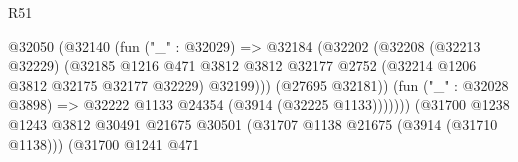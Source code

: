 \begin{lexlean}{R51}
\begin{coremodule}
                                                      @32050
                                                        (@32140
                                                          (fun ("_" : @32029) =>
                                                          @32184
                                                            (@32202
                                                              (@32208
                                                                (@32213 @32229)
                                                                (@32185
                                                                  @1216
                                                                  @471
                                                                  @3812
                                                                  @3812
                                                                  @32177
                                                                  @2752
                                                                  (@32214
                                                                    @1206
                                                                    @3812
                                                                    @32175
                                                                    @32177
                                                                    @32229)
                                                                  @32199)))
                                                            (@27695 @32181))
                                                          (fun ("_" : @32028 @3898) =>
                                                          @32222
                                                            @1133
                                                            @24354
                                                            (@3914 (@32225 @1133)))))))
                                                  (@31700
                                                    @1238
                                                    @1243
                                                    @3812
                                                    @30491
                                                    @21675
                                                    @30501
                                                    (@31707 @1138 @21675 (@3914 (@31710 @1138)))
                                                    (@31700
                                                      @1241
                                                      @471

\end{coremodule}
\end{lexlean}
